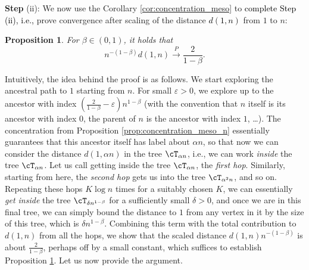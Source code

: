 \documentclass[letterpaper,11pt,reqno]{amsart}
\newtheorem{prop}[thm]{Proposition}
\theoremstyle{definition}
\newcommand{\eps}{\varepsilon}
\newcommand{\convp}{\stackrel{P}{\longrightarrow}}
\begin{document}
\textbf{Step} (ii): We now use the Corollary \ref{cor:concentration_meso} to \textcolor{black}{complete Step (ii), i.e.,} prove convergence after scaling of the distance \textcolor{black}{$d(1,n)$} from $1$ to $n$:
\begin{prop}\label{prop:dist_limit}
For $\beta \in (0,1)$, it holds that 
\[n^{-(1-\beta)} d(1,n)\convp \frac{2}{1-\beta}. \]
\end{prop}
Intuitively, the idea behind the proof is as follows. We start exploring the ancestral path to $1$ starting from $n$. For small $\eps>0$, we explore up to the ancestor with index $\left(\frac{2}{1-\beta}-\eps\right)n^{1-\beta}$ (with the convention that $n$ itself is its ancestor with index $0$, the parent of $n$ is the ancestor with index $1$, \dots). The concentration from Proposition \ref{prop:concentration_meso_n} essentially guarantees that this ancestor itself has label about $\alpha n$, so that now we can consider the distance $d(1,\alpha n)$ in the tree $\cT_{\alpha n}$, i.e., we can work \emph{inside} the tree $\cT_{\alpha n}$. Let us call getting inside the tree $\cT_{\alpha n}$, the \emph{first hop}. Similarly, starting from here, the \emph{second hop} gets us into the tree $\cT_{\alpha^2 n}$, and so on. Repeating these hops $K \log n$ times for a suitably chosen $K$, we can essentially \emph{get inside} the tree $\cT_{\delta n^{1-\beta}}$ for a sufficiently small $\delta>0$, and once we are in this final tree, we can simply bound the distance to $1$ from any vertex in it by the size of this tree, which is $\delta n^{1-\beta}$. Combining this term with the total contribution to $d(1,n)$ from all the hops, we show that the scaled distance $d(1,n)n^{-(1-\beta)}$ is about $\frac{2}{1-\beta}$, perhaps off by a small constant, which suffices to establish Proposition \ref{prop:dist_limit}. Let us now provide the argument.  
\end{document}
